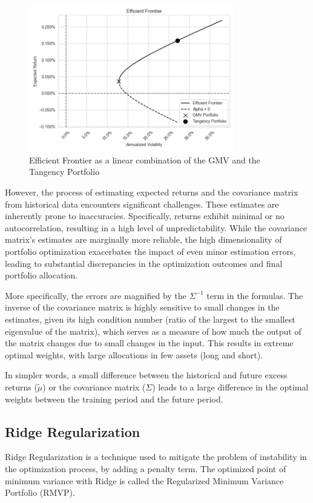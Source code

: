\documentclass{article}
\begin{document}
\begin{figure}[h]
    \centering
    \includegraphics[width=0.8\textwidth]{graphics/illustrations/efficient_frontier.png}
    \caption{Efficient Frontier as a linear combination of the GMV and the Tangency Portfolio}
    \label{fig:efficient_frontier}
\end{figure}

However, the process of estimating expected returns and the covariance matrix from historical data encounters significant challenges. These estimates are inherently prone to inaccuracies. Specifically, returns exhibit minimal or no autocorrelation, resulting in a high level of unpredictability. While the covariance matrix's estimates are marginally more reliable, the high dimensionality of portfolio optimization exacerbates the impact of even minor estimation errors, leading to substantial discrepancies in the optimization outcomes and final portfolio allocation.

More specifically, the errors are magnified by the $\Sigma^{-1}$ term in the formulas. The inverse of the covariance matrix is highly sensitive to small changes in the estimates, given its high condition number (ratio of the largest to the smallest eigenvalue of the matrix), which serves as a measure of how much the output of the matrix changes due to small changes in the input. This results in extreme optimal weights, with large allocations in few assets (long and short).

In simpler words, a small difference between the historical and future excess returns ($\tilde{\mu}$) or the covariance matrix ($\Sigma$) leads to a large difference in the optimal weights between the training period and the future period.

\FloatBarrier
\subsection{Ridge Regularization}
Ridge Regularization is a technique used to mitigate the problem of instability in the optimization process, by adding a penalty term. The optimized point of minimum variance with Ridge is called the Regularized Minimum Variance Portfolio (RMVP).
\end{document}
